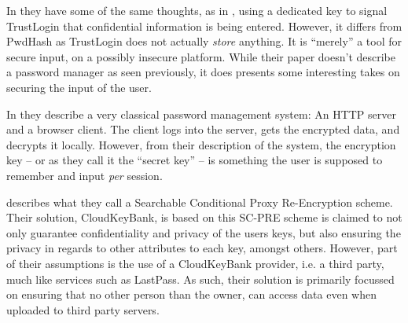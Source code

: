 			In \cite{zhang2015} they have some of the same thoughts, as in \cite{pwdhash}, using a dedicated key to signal TrustLogin that confidential information is being entered. However, it differs from PwdHash as TrustLogin does not actually \emph{store} anything. It is ``merely'' a tool for secure input, on a possibly insecure platform. While their paper doesn't describe a password manager as seen previously, it does presents some interesting takes on securing the input of the user.

			In \cite{englert2009} they describe a very classical password management system: An HTTP server and a browser client. The client logs into the server, gets the encrypted data, and decrypts it locally. However, from their description of the system, the encryption key -- or as they call it the ``secret key'' -- is something the user is supposed to remember and input \emph{per} session. 

			\cite{huang2015} describes what they call a Searchable Conditional Proxy Re-Encryption scheme. Their solution, CloudKeyBank, is based on this SC-PRE scheme is claimed to not only guarantee confidentiality and privacy of the users keys, but also ensuring the privacy in regards to other attributes to each key, amongst others. However, part of their assumptions is the use of a CloudKeyBank provider, i.e. a third party, much like services such as LastPass. As such, their solution is primarily focussed on ensuring that no other person than the owner, can access data even when uploaded to third party servers.